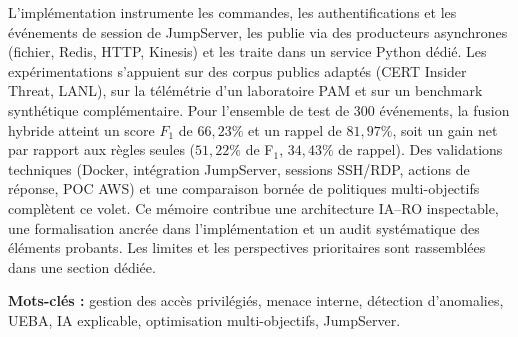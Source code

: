 \documentclass[11pt,a4paper,oneside]{report}
\theoremstyle{definition}
\theoremstyle{plain}
\begin{document}
L'implémentation instrumente les commandes, les authentifications et les événements de session de JumpServer, les publie via des producteurs asynchrones (fichier, Redis, HTTP, Kinesis) et les traite dans un service Python dédié. Les expérimentations s'appuient sur des corpus publics adaptés (CERT Insider Threat, LANL), sur la télémétrie d'un laboratoire PAM et sur un benchmark synthétique complémentaire. Pour l'ensemble de test de 300 événements, la fusion hybride atteint un score $F_1$ de $66{,}23\%$ et un rappel de $81{,}97\%$, soit un gain net par rapport aux règles seules ($51{,}22\%$ de F$_1$, $34{,}43\%$ de rappel). Des validations techniques (Docker, intégration JumpServer, sessions SSH/RDP, actions de réponse, POC AWS) et une comparaison bornée de politiques multi-objectifs complètent ce volet. Ce mémoire contribue une architecture IA--RO inspectable, une formalisation ancrée dans l'implémentation et un audit systématique des éléments probants. Les limites et les perspectives prioritaires sont rassemblées dans une section dédiée.

\medskip
\noindent\textbf{Mots-clés :} gestion des accès privilégiés, menace interne, détection d'anomalies, UEBA, IA explicable, optimisation multi-objectifs, JumpServer.
\end{document}
